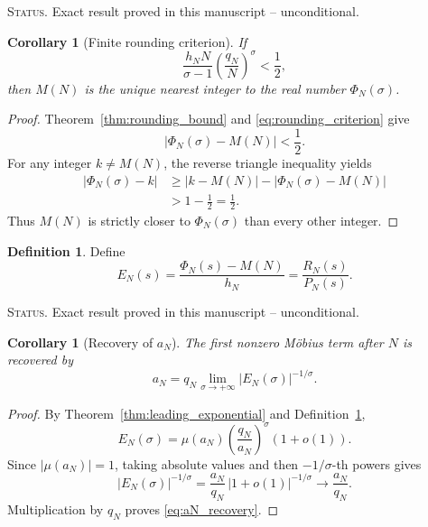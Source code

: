 \documentclass[11pt]{amsart}
\numberwithin{equation}{section}
\theoremstyle{plain}
\newtheorem{corollary}[theorem]{Corollary}
\theoremstyle{definition}
\newtheorem{definition}[theorem]{Definition}
\theoremstyle{remark}
\newcommand{\1}{\mathbf{1}}
\newcommand{\statusnote}[1]{%
  \par\smallskip\noindent
  \begingroup\footnotesize\textsc{Status.} #1\endgroup
  \par\smallskip}
\begin{document}
\statusnote{Exact result proved in this manuscript -- unconditional.}
\begin{corollary}[Finite rounding criterion]
\label{cor:rounding_criterion}
If
\begin{equation}
\boxed{
\frac{h_NN}{\sigma-1}
\left(\frac{q_N}{N}\right)^\sigma
<
\frac12,
}
\label{eq:rounding_criterion}
\end{equation}
then \(M(N)\) is the unique nearest integer to the real number
\(\Phi_N(\sigma)\).
\end{corollary}

\begin{proof}
Theorem~\ref{thm:rounding_bound} and
\eqref{eq:rounding_criterion} give
\begin{equation}
|\Phi_N(\sigma)-M(N)|<\frac12.
\label{eq:rounding_criterion_proof_ball}
\end{equation}
For any integer \(k\neq M(N)\), the reverse triangle inequality yields
\begin{align}
|\Phi_N(\sigma)-k|
&\geq
|k-M(N)|-|\Phi_N(\sigma)-M(N)|
\label{eq:rounding_reverse_triangle_one}
\\
&>
1-\frac12
=
\frac12.
\label{eq:rounding_reverse_triangle_two}
\end{align}
Thus \(M(N)\) is strictly closer to \(\Phi_N(\sigma)\) than every other
integer.
\end{proof}

\begin{definition}
\label{def:EN}
Define
\begin{equation}
E_N(s)
=
\frac{\Phi_N(s)-M(N)}{h_N}
=
\frac{R_N(s)}{P_N(s)}.
\label{eq:EN_definition}
\end{equation}
\end{definition}

\statusnote{Exact result proved in this manuscript -- unconditional.}
\begin{corollary}[Recovery of \(a_N\)]
\label{cor:aN_recovery}
The first nonzero Möbius term after \(N\) is recovered by
\begin{equation}
\boxed{
a_N
=
q_N
\lim_{\sigma\to+\infty}
|E_N(\sigma)|^{-1/\sigma}.
}
\label{eq:aN_recovery}
\end{equation}
\end{corollary}

\begin{proof}
By Theorem~\ref{thm:leading_exponential} and
Definition~\ref{def:EN},
\begin{equation}
E_N(\sigma)
=
\mu(a_N)
\left(\frac{q_N}{a_N}\right)^\sigma
(1+o(1)).
\label{eq:aN_recovery_asymptotic}
\end{equation}
Since \(|\mu(a_N)|=1\), taking absolute values and then
\(-1/\sigma\)-th powers gives
\begin{equation}
|E_N(\sigma)|^{-1/\sigma}
=
\frac{a_N}{q_N}
\,|1+o(1)|^{-1/\sigma}
\longrightarrow
\frac{a_N}{q_N}.
\label{eq:aN_recovery_root_limit}
\end{equation}
Multiplication by \(q_N\) proves \eqref{eq:aN_recovery}.
\end{proof}
\end{document}
